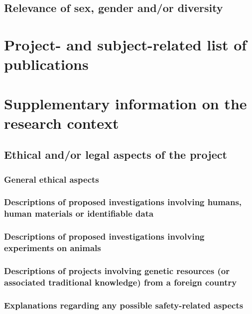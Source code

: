 \documentclass{scrartcl}
\begin{document}
\subsection{Relevance of sex, gender and/or diversity}

\section{Project- and subject-related list of publications}
\label{sec:bib}


\backmatter
\section{Supplementary information on the research context}

\subsection{Ethical and/or legal aspects of the project}

\subsubsection{General ethical aspects}

\subsubsection{Descriptions of proposed investigations involving humans, human materials or identifiable data}

\subsubsection{Descriptions of proposed investigations involving experiments on animals}

\subsubsection{Descriptions of projects involving genetic resources (or associated traditional knowledge) from a foreign country}

\subsubsection{Explanations regarding any possible safety-related aspects}
\end{document}
